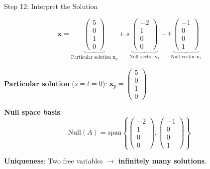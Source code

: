 \documentclass[10pt]{beamer}
\theoremstyle{definition}
\newcommand{\x}[1]{\alert{\textbf{#1}}}
\begin{document}
\begin{frame}{Step 12: Interpret the Solution}

$$\mathbf{x} = \underbrace{\begin{pmatrix} 5 \\ 0 \\ 1 \\ 0 \end{pmatrix}}_{\text{Particular solution } \mathbf{x}_p} + s\underbrace{\begin{pmatrix} -2 \\ 1 \\ 0 \\ 0 \end{pmatrix}}_{\text{Null vector } \mathbf{v}_1} + t\underbrace{\begin{pmatrix} -1 \\ 0 \\ 0 \\ 1 \end{pmatrix}}_{\text{Null vector } \mathbf{v}_2}$$

\vspace{1em}

\x{Particular solution} ($s = t = 0$): $\mathbf{x}_p = \begin{pmatrix} 5 \\ 0 \\ 1 \\ 0 \end{pmatrix}$

\vspace{0.5em}

\x{Null space basis}:
$$\text{Null}(A) = \text{span}\left\{\begin{pmatrix} -2 \\ 1 \\ 0 \\ 0 \end{pmatrix}, \begin{pmatrix} -1 \\ 0 \\ 0 \\ 1 \end{pmatrix}\right\}$$

\vspace{0.5em}

\x{Uniqueness}: Two free variables $\to$ \textbf{infinitely many solutions}.

\end{frame}

\end{document}
